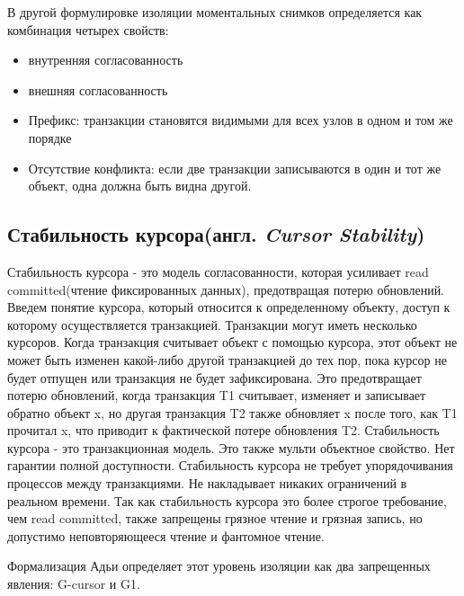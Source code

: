 \documentclass[12pt,  openany]{book}
\begin{document}
В другой формулировке изоляции моментальных снимков определяется как комбинация четырех свойств:
\begin{itemize}
\item внутренняя согласованность
\item внешняя согласованность
\item Префикс: транзакции становятся видимыми для всех узлов в одном и том же порядке
\item Отсутствие конфликта: если две транзакции записываются в один и тот же объект, одна должна быть видна другой.
\end{itemize}

\subsection{Стабильность курсора(англ.  \textit{Cursor Stability})}
Стабильность курсора - это модель согласованности, которая усиливает read committed(чтение фиксированных данных), предотвращая потерю обновлений.
Введем понятие курсора, который относится к определенному объекту, доступ к которому осуществляется транзакцией. Транзакции могут иметь несколько курсоров. Когда транзакция считывает объект с помощью курсора, этот объект не может быть изменен какой-либо другой транзакцией до тех пор, пока курсор не будет отпущен или транзакция не будет зафиксирована.
Это предотвращает потерю обновлений, когда транзакция T1 считывает, изменяет и записывает обратно объект x, но другая транзакция T2 также обновляет x после того, как T1 прочитал x, что приводит к фактической потере обновления T2.
Стабильность курсора - это транзакционная модель. Это также мульти объектное свойство.
Нет гарантии полной доступности.
Стабильность курсора не требует упорядочивания процессов между транзакциями.
Не накладывает никаких ограничений в реальном времени.
Так как стабильность курсора это более строгое требование, чем read committed, также запрещены грязное чтение и грязная запись, но допустимо неповторяющееся чтение и фантомное чтение.

Формализация Адьи определяет этот уровень изоляции как два запрещенных явления: G-cursor и G1.
\end{document}
